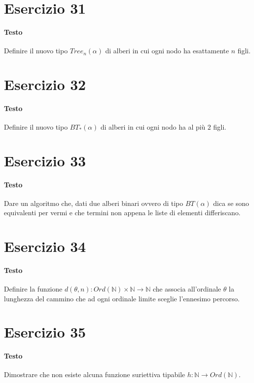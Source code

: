 \documentclass[a4paper,10pt]{article}
\begin{document}
\section*{Esercizio 31}
\paragraph{Testo}
Definire il nuovo tipo $Tree_n(\alpha)$ di alberi in cui ogni nodo ha esattamente $n$ figli.

\section*{Esercizio 32}
\paragraph{Testo}
Definire il nuovo tipo $BT_\ast (\alpha)$ di alberi in cui ogni nodo ha al più $2$ figli.

\section*{Esercizio 33}
\paragraph{Testo}
Dare un algoritmo che, dati due alberi binari ovvero di tipo $BT(\alpha)$ dica se sono equivalenti per vermi e che termini non appena le liste di elementi differiscano.

\section*{Esercizio 34}
\paragraph{Testo}
Definire la funzione $d(\theta, n) : Ord(\mathbb{N}) \times \mathbb{N} \rightarrow \mathbb{N}$ che associa all’ordinale $\theta$ la lunghezza del cammino che ad ogni ordinale limite sceglie l’ennesimo percorso.

\section*{Esercizio 35}
\paragraph{Testo}
Dimostrare che non esiste alcuna funzione suriettiva tipabile $h : \mathbb{N} \rightarrow Ord(\mathbb{N})$.
\end{document}
